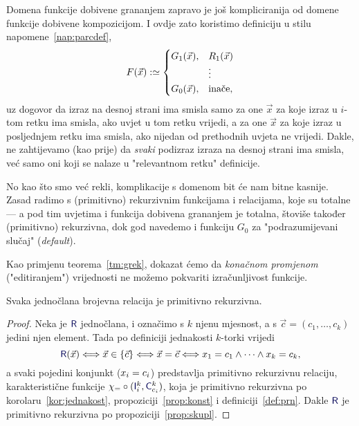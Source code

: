 Domena funkcije dobivene grananjem zapravo je još kompliciranija od domene funkcije dobivene kompozicijom. I ovdje zato koristimo definiciju u stilu napomene~\ref{nap:parcdef},
\begin{equation}
    F(\vec x):\simeq\begin{cases}
    G_1(\vec x),&R_1(\vec x)\\
    &\vdots\\
    G_0(\vec x),&\text{inače}\text,
    \end{cases}
\end{equation}
uz dogovor da izraz na desnoj strani ima smisla samo za one $\vec x$ za koje izraz u $i$-tom retku ima smisla, ako uvjet u tom retku vrijedi, a za one $\vec x$ za koje izraz u posljednjem retku ima smisla, ako nijedan od prethodnih uvjeta ne vrijedi. Dakle, ne zahtijevamo (kao prije) da \emph{svaki} podizraz izraza na desnoj strani ima smisla, već samo oni koji se nalaze u "relevantnom retku" definicije.

No kao što smo već rekli, komplikacije s domenom bit će nam bitne kasnije. Zasad radimo s (primitivno) rekurzivnim funkcijama i relacijama, koje su totalne --- a pod tim uvjetima i funkcija dobivena grananjem je totalna, štoviše također (primitivno) rekurzivna, dok god navedemo i funkciju $G_0$ za "podrazumijevani slučaj" (\emph{default}).


Kao primjenu teorema~\ref{tm:grek}, dokazat ćemo da \emph{konačnom promjenom} ("editiranjem") vrijednosti ne možemo pokvariti izračunljivost funkcije. %

\begin{lema}\label{lm:r1prn}
Svaka jednočlana brojevna relacija je primitivno rekurzivna.
\end{lema}
\begin{proof}
Neka je $\f R$ jednočlana, i označimo s $k$ njenu mjesnost, a s $\vec c=(c_1,\dotsc,c_k)$ jedini njen element. Tada po definiciji jednakosti $k$-torki vrijedi
\begin{equation}
    \f R(\vec x)\Longleftrightarrow\vec x\in\{\vec c\}\Longleftrightarrow\vec x=\vec c\Longleftrightarrow x_1\eq c_1\land\dotsb\land x_k\eq c_k\text,
\end{equation}
a svaki pojedini konjunkt ($x_i= c_i$) predstavlja primitivno rekurzivnu relaciju, karakteristične funkcije $\chi_\eq\circ(\f I_i^k,\f C_{c_i}^k)$, koja je primitivno rekurzivna po korolaru~\ref{kor:jednakost}, propoziciji~\ref{prop:konst} i definiciji~\ref{def:prn}. Dakle $\f R$ je primitivno rekurzivna po propoziciji~\ref{prop:skupl}.
\end{proof}


